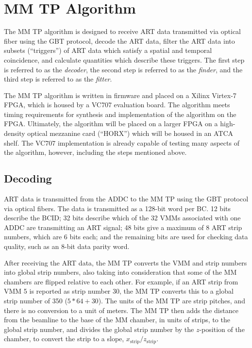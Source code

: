 \section{MM TP Algorithm}
\label{sec:alg}

The MM TP algorithm is designed to receive ART data transmitted via optical fiber using the GBT protocol, decode the ART data, filter the ART data into subsets (``triggers'') of ART data which satisfy a spatial and temporal coincidence, and calculate quantities which describe these triggers. The first step is referred to as the \textit{decoder}, the second step is referred to as the \textit{finder}, and the third step is referred to as the \textit{fitter}.

The MM TP algorithm is written in firmware and placed on a Xilinx Virtex-7 FPGA, which is housed by a VC707 evaluation board. The algorithm meets timing requirements for synthesis and implementation of the algorithm on the FPGA. Ultimately, the algorithm will be placed on a larger FPGA on a high-density optical mezzanine card (``HORX'') which will be housed in an ATCA shelf. The VC707 implementation is already capable of testing many aspects of the algorithm, however, including the steps mentioned above.

\subsection{Decoding}
\label{sec:alg-decode}

ART data is transmitted from the ADDC to the MM TP using the GBT protocol via optical fibers. The data is transmitted as a 128-bit word per BC. 12 bits describe the BCID; 32 bits describe which of the 32 VMMs associated with one ADDC are transmitting an ART signal; 48 bits give a maximum of 8 ART strip numbers, which are 6 bits each; and the remaining bits are used for checking data quality, such as an 8-bit data parity word.

After receiving the ART data, the MM TP converts the VMM and strip numbers into global strip numbers, also taking into consideration that some of the MM chambers are flipped relative to each other. For example, if an ART strip from VMM 5 is reported as strip number 30, the MM TP converts this to a global strip number of 350 ($5*64 + 30$). The units of the MM TP are strip pitches, and there is no conversion to a unit of meters. The MM TP then adds the distance from the beamline to the base of the MM chamber, in units of strips, to the global strip number, and divides the global strip number by the $z$-position of the chamber, to convert the strip to a slope, $x_\text{strip} / z_\text{strip}$.

